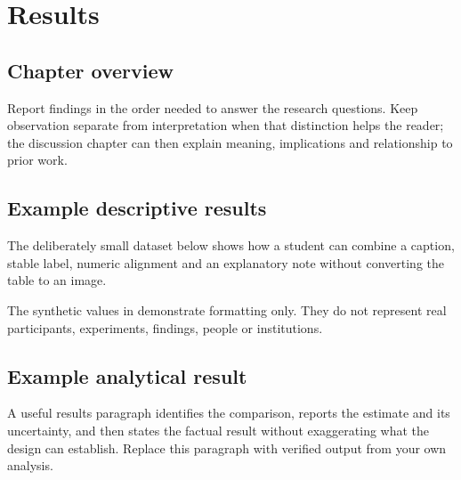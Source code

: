 \chapter{Results}
\label{chap:results}

\section{Chapter overview}
Report findings in the order needed to answer the research questions. Keep observation
separate from interpretation when that distinction helps the reader; the discussion
chapter can then explain meaning, implications and relationship to prior work.

\section{Example descriptive results}
The deliberately small dataset below shows how a student can combine a caption, stable
label, numeric alignment and an explanatory note without converting the table to an image.


The synthetic values in  demonstrate formatting only. They do
not represent real participants, experiments, findings, people or institutions.

\section{Example analytical result}
A useful results paragraph identifies the comparison, reports the estimate and its
uncertainty, and then states the factual result without exaggerating what the design
can establish. Replace this paragraph with verified output from your own analysis.

